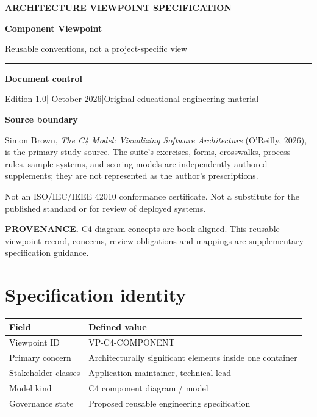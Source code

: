 \documentclass[10pt,letterpaper]{article}
\newcommand{\SourceNote}[1]{\par\smallskip\noindent\colorbox{C4Light}{\parbox{0.94\linewidth}{\footnotesize\textbf{PROVENANCE.} #1}}\par\medskip}
\newcommand{\DocStart}[3]{%
\begin{document}
\begin{titlepage}
\renewcommand{\thepage}{title-\arabic{page}}
\vspace*{0.55in}
{\sffamily\bfseries\small\color{C4Teal}#1}\par\vspace{0.24in}
{\sffamily\bfseries\fontsize{26}{31}\selectfont\color{C4Navy}#2}\par\vspace{0.18in}
{\large\color{C4Gray}#3}\par\vspace{0.4in}
\textcolor{C4Teal}{\rule{\linewidth}{1.15pt}}\par\vspace{0.24in}
\textbf{Document control}\par
Edition 1.0\quad|\quad 30 October 2026\quad|\quad Original educational engineering material\par
\vspace{0.17in}
\textbf{Source boundary}\par
Simon Brown, \emph{The C4 Model: Visualizing Software Architecture} (O'Reilly, 2026), is the primary study source. The suite's exercises, forms, crosswalks, process rules, sample systems, and scoring models are independently authored supplements; they are not represented as the author's prescriptions.\par
\vfill
{\small\color{C4Gray}Not an ISO/IEC/IEEE 42010 conformance certificate. Not a substitute for the published standard or for review of deployed systems.}\par
\end{titlepage}
}
\DocStart{ARCHITECTURE VIEWPOINT SPECIFICATION}{Component Viewpoint}{Reusable conventions, not a project-specific view}
\SourceNote{C4 diagram concepts are book-aligned. This reusable viewpoint record, concerns, review obligations and mappings are supplementary specification guidance.}
\section{Specification identity}
\begin{tabularx}{\linewidth}{@{}YY@{}}\toprule
\textbf{Field} & \textbf{Defined value} \\ \midrule
Viewpoint ID & VP-C4-COMPONENT \\
Primary concern & Architecturally significant elements inside one container \\
Stakeholder classes & Application maintainer, technical lead \\
Model kind & C4 component diagram / model \\
Governance state & Proposed reusable engineering specification \\
\bottomrule\end{tabularx}
\end{document}
